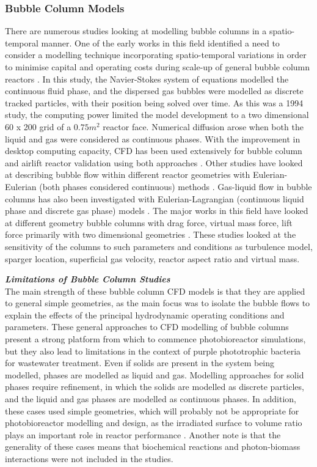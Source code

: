 \subsubsection{Bubble Column Models}
There are numerous studies looking at modelling bubble columns in a spatio-temporal manner. One of the early works in this field identified a need to consider a modelling technique incorporating spatio-temporal variations in order to minimise capital and operating costs during scale-up of general bubble column reactors \cite{lapin1994}. In this study, the Navier-Stokes system of equations modelled the continuous fluid phase, and the dispersed gas bubbles were modelled as discrete tracked particles, with their position being solved over time. As this was a 1994 study, the computing power limited the model development to a two dimensional 60 x 200 grid of a $0.75 m^{2}$ reactor face. Numerical diffusion arose when both the liquid and gas were considered as continuous phases. With the improvement in desktop computing capacity, CFD has been used extensively for bubble column and airlift reactor validation using both approaches \cite{bitog2011}. Other studies have looked at describing bubble flow within different reactor geometries with Eulerian-Eulerian (both phases considered continuous) methods \cite{lehr2002, pfleger2001, buwa2002, pareek2003, ekambara2005, sokolichin1999}. Gas-liquid flow in bubble columns has also been investigated with Eulerian-Lagrangian (continuous liquid phase and discrete gas phase) models \cite{zhang2013a}. The major works in this field have looked at different geometry bubble columns with drag force, virtual mass force, lift force primarily with two dimensional geometries \cite{buwa2006, goz2004, luo2011, ekambara2005, mouza2004}. These studies looked at the sensitivity of the columns to such parameters and conditions as turbulence model, sparger location, superficial gas velocity, reactor aspect ratio and virtual mass.
\skippingparagraph

\textbf{\textit{Limitations of Bubble Column Studies}} \\
The main strength of these bubble column CFD models is that they are applied to general simple geometries, as the main focus was to isolate the bubble flows to explain the effects of the principal hydrodynamic operating conditions and parameters. These general approaches to CFD modelling of bubble columns present a strong platform from which to commence photobioreactor simulations, but they also lead to limitations in the context of purple phototrophic bacteria for wastewater treatment. Even if solids are present in the system being modelled, phases are modelled as liquid and gas. Modelling approaches for solid phases require refinement, in which the solids are modelled as discrete particles, and the liquid and gas phases are modelled as continuous phases. In addition, these cases used simple geometries, which will probably not be appropriate for photobioreactor modelling and design, as the irradiated surface to volume ratio plays an important role in reactor performance \cite{soman2015}. Another note is that the generality of these cases means that biochemical reactions and photon-biomass interactions were not included in the studies. 
\skippingparagraph


